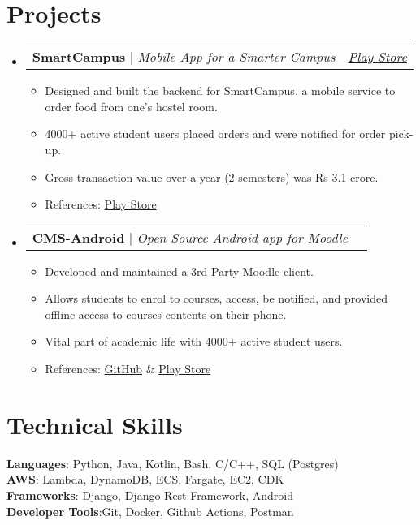 \documentclass[a4paper,11pt]{article}
\makeatletter
\newcommand{\resumeItem}[1]{
  \item\small{
    {#1 \vspace{-2pt}}
  }
}
\newcommand{\resumeProjectHeading}[2]{
    \item
    \begin{tabular*}{0.97\textwidth}{l@{\extracolsep{\fill}}r}
      \small#1 & #2 \\
    \end{tabular*}\vspace{-7pt}
}
\newcommand{\resumeSubHeadingListStart}{\begin{itemize}[leftmargin=0.15in, label={}]}
\newcommand{\resumeSubHeadingListEnd}{\end{itemize}}
\newcommand{\resumeItemListStart}{\begin{itemize}}
\newcommand{\resumeItemListEnd}{\end{itemize}\vspace{-5pt}}
\makeatother
\begin{document}
\section{Projects}
    \resumeSubHeadingListStart
      \resumeProjectHeading
					{\textbf{SmartCampus} $|$ \emph{Mobile App for a Smarter
					Campus}}{\textit{\href{https://play.google.com/store/apps/details?id=com.smartcampus\_bphc}{Play Store}}}
          \resumeItemListStart
						\resumeItem{Designed and built the backend for SmartCampus, a mobile service to order food from one's hostel room.}
						\resumeItem{4000+ active student users placed orders and were notified for order pick-up.}
						\resumeItem{Gross transaction value over a year (2 semesters) was Rs 3.1 crore.}
						\resumeItem{References:
						\href{https://play.google.com/store/apps/details?id=com.smartcampus\_bphc}{Play Store}}
          \resumeItemListEnd
      \resumeProjectHeading
					{\textbf{CMS-Android} $|$ \emph{Open Source Android app for Moodle}}{}
          \resumeItemListStart
						\resumeItem{Developed and maintained a 3rd Party Moodle client.}
						\resumeItem{Allows students to enrol to courses, access, be notified, and provided
						offline access to courses contents on their phone.}
						\resumeItem{Vital part of academic life with 4000+ active student users.}
						\resumeItem{References: \href{https://github.com/crux-bphc/CMS-Android}{GitHub}
						\& \href{https://play.google.com/store/apps/details?id=crux.bphc.cms}{Play Store}}
          \resumeItemListEnd
    \resumeSubHeadingListEnd

%
\section{Technical Skills}
 \begin{itemize}[leftmargin=0.15in, label={}]
    \small{\item{
     \textbf{Languages}{: Python, Java, Kotlin, Bash, C/C++, SQL (Postgres)} \\
     \textbf{AWS}{: Lambda, DynamoDB, ECS, Fargate, EC2, CDK} \\
		 \textbf{Frameworks}{: Django, Django Rest Framework, Android} \\
     \textbf{Developer Tools}{:Git, Docker, Github Actions, Postman} \\
    }}
 \end{itemize}


\end{document}
